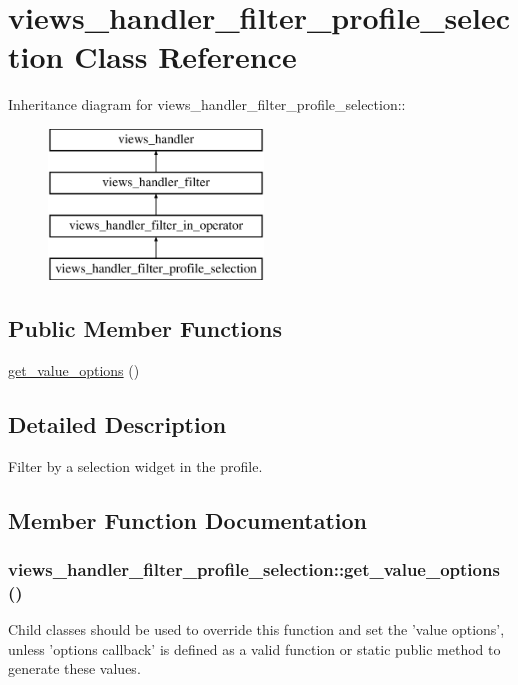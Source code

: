 \hypertarget{classviews__handler__filter__profile__selection}{
\section{views\_\-handler\_\-filter\_\-profile\_\-selection Class Reference}
\label{classviews__handler__filter__profile__selection}
}
Inheritance diagram for views\_\-handler\_\-filter\_\-profile\_\-selection::\begin{figure}[H]
\begin{center}
\leavevmode
\includegraphics[height=4cm]{classviews__handler__filter__profile__selection}
\end{center}
\end{figure}
\subsection*{Public Member Functions}
\begin{DoxyCompactItemize}
\item 
\hyperlink{classviews__handler__filter__profile__selection_a83d4168bf90f6906fc4cc9db17193d0c}{get\_\-value\_\-options} ()
\end{DoxyCompactItemize}


\subsection{Detailed Description}
Filter by a selection widget in the profile. 

\subsection{Member Function Documentation}
\hypertarget{classviews__handler__filter__profile__selection_a83d4168bf90f6906fc4cc9db17193d0c}{
\subsubsection[{get\_\-value\_\-options}]{\setlength{\rightskip}{0pt plus 5cm}views\_\-handler\_\-filter\_\-profile\_\-selection::get\_\-value\_\-options ()}}
\label{classviews__handler__filter__profile__selection_a83d4168bf90f6906fc4cc9db17193d0c}
Child classes should be used to override this function and set the 'value options', unless 'options callback' is defined as a valid function or static public method to generate these values.


